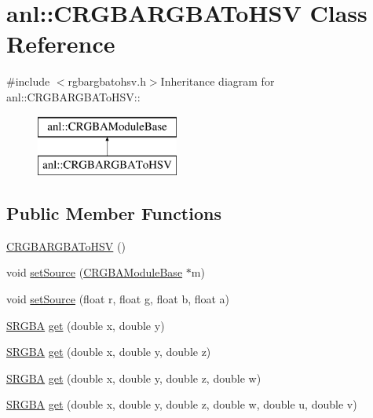 \hypertarget{classanl_1_1CRGBARGBAToHSV}{
\section{anl::CRGBARGBAToHSV Class Reference}
\label{classanl_1_1CRGBARGBAToHSV}
}


{\ttfamily \#include $<$rgbargbatohsv.h$>$}Inheritance diagram for anl::CRGBARGBAToHSV::\begin{figure}[H]
\begin{center}
\leavevmode
\includegraphics[height=2cm]{classanl_1_1CRGBARGBAToHSV}
\end{center}
\end{figure}
\subsection*{Public Member Functions}
\begin{DoxyCompactItemize}
\item 
\hyperlink{classanl_1_1CRGBARGBAToHSV_aaaff1f615177198ad394a46aba86b3cb}{CRGBARGBAToHSV} ()
\item 
void \hyperlink{classanl_1_1CRGBARGBAToHSV_a5efc7fc61bca05ad790240574bbec6e0}{setSource} (\hyperlink{classanl_1_1CRGBAModuleBase}{CRGBAModuleBase} $\ast$m)
\item 
void \hyperlink{classanl_1_1CRGBARGBAToHSV_a1047ed35c324304dd24289866ab33a7b}{setSource} (float r, float g, float b, float a)
\item 
\hyperlink{structanl_1_1SRGBA}{SRGBA} \hyperlink{classanl_1_1CRGBARGBAToHSV_a8252d1e38975101abf4ea30a23595a3a}{get} (double x, double y)
\item 
\hyperlink{structanl_1_1SRGBA}{SRGBA} \hyperlink{classanl_1_1CRGBARGBAToHSV_a4d51e587ffc235a8620f516b2a701288}{get} (double x, double y, double z)
\item 
\hyperlink{structanl_1_1SRGBA}{SRGBA} \hyperlink{classanl_1_1CRGBARGBAToHSV_afffc1b06757cd5a31d4e1adf8621a4b5}{get} (double x, double y, double z, double w)
\item 
\hyperlink{structanl_1_1SRGBA}{SRGBA} \hyperlink{classanl_1_1CRGBARGBAToHSV_ae1e0c7aad9142812d8df07f6c1102c00}{get} (double x, double y, double z, double w, double u, double v)
\end{DoxyCompactItemize}
